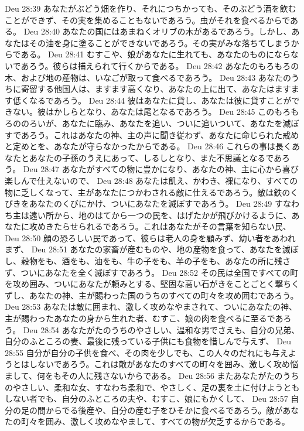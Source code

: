 Deu 28:39  あなたがぶどう畑を作り、それにつちかっても、そのぶどう酒を飲むことができず、その実を集めることもないであろう。虫がそれを食べるからである。
Deu 28:40  あなたの国にはあまねくオリブの木があるであろう。しかし、あなたはその油を身に塗ることができないであろう。その実がみな落ちてしまうからである。
Deu 28:41  むすこや、娘があなたに生れても、あなたのものにならないであろう。彼らは捕えられて行くからである。
Deu 28:42  あなたのもろもろの木、および地の産物は、いなごが取って食べるであろう。
Deu 28:43  あなたのうちに寄留する他国人は、ますます高くなり、あなたの上に出て、あなたはますます低くなるであろう。
Deu 28:44  彼はあなたに貸し、あなたは彼に貸すことができない。彼はかしらとなり、あなたは尾となるであろう。
Deu 28:45  このもろもろののろいが、あなたに臨み、あなたを追い、ついに追いついて、あなたを滅ぼすであろう。これはあなたの神、主の声に聞き従わず、あなたに命じられた戒めと定めとを、あなたが守らなかったからである。
Deu 28:46  これらの事は長くあなたとあなたの子孫のうえにあって、しるしとなり、また不思議となるであろう。
Deu 28:47  あなたがすべての物に豊かになり、あなたの神、主に心から喜び楽しんで仕えないので、
Deu 28:48  あなたは飢え、かわき、裸になり、すべての物に乏しくなって、主があなたにつかわされる敵に仕えるであろう。敵は鉄のくびきをあなたのくびにかけ、ついにあなたを滅ぼすであろう。
Deu 28:49  すなわち主は遠い所から、地のはてから一つの民を、はげたかが飛びかけるように、あなたに攻めきたらせられるであろう。これはあなたがその言葉を知らない民、
Deu 28:50  顔の恐ろしい民であって、彼らは老人の身を顧みず、幼い者をあわれまず、
Deu 28:51  あなたの家畜が産むものや、地の産物を食って、あなたを滅ぼし、穀物をも、酒をも、油をも、牛の子をも、羊の子をも、あなたの所に残さず、ついにあなたを全く滅ぼすであろう。
Deu 28:52  その民は全国ですべての町を攻め囲み、ついにあなたが頼みとする、堅固な高い石がきをことごとく撃ちくずし、あなたの神、主が賜わった国のうちのすべての町々を攻め囲むであろう。
Deu 28:53  あなたは敵に囲まれ、激しく攻めなやまされて、ついにあなたの神、主が賜わったあなたの身から生れた者、むすこ、娘の肉を食べるに至るであろう。
Deu 28:54  あなたがたのうちのやさしい、温和な男でさえも、自分の兄弟、自分のふところの妻、最後に残っている子供にも食物を惜しんで与えず、
Deu 28:55  自分が自分の子供を食べ、その肉を少しでも、この人々のだれにも与えようとはしないであろう。これは敵があなたのすべての町々を囲み、激しく攻め悩まして、何をもその人に残さないからである。
Deu 28:56  またあなたがたのうちのやさしい、柔和な女、すなわち柔和で、やさしく、足の裏を土に付けようともしない者でも、自分のふところの夫や、むすこ、娘にもかくして、
Deu 28:57  自分の足の間からでる後産や、自分の産む子をひそかに食べるであろう。敵があなたの町々を囲み、激しく攻めなやまして、すべての物が欠乏するからである。
